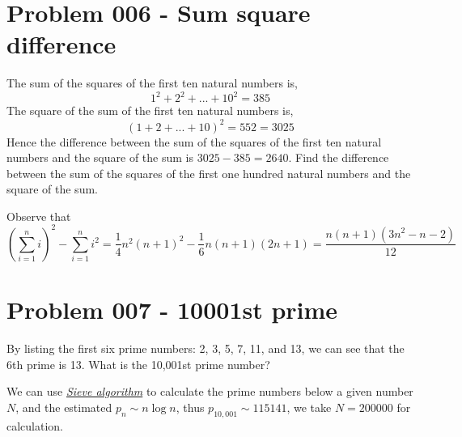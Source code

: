 \section{Problem 006 - Sum square difference}
\begin{prob}
The sum of the squares of the first ten natural numbers is,
$$1^2 + 2^2 + ... + 10^2 = 385$$
The square of the sum of the first ten natural numbers is,
$$(1 + 2 + ... + 10)^2 = 552 = 3025$$
Hence the difference between the sum of the squares of the first ten natural numbers and the square of the sum is $3025 - 385 = 2640$.
Find the difference between the sum of the squares of the first one hundred natural numbers and the square of the sum.
\end{prob}

\begin{sol}
Observe that
$$(\sum_{i = 1}^n i )^2 - \sum_{i = 1}^n i^2 = \frac{1}{4} n^2(n + 1)^2  - \frac{1}{6} n (n + 1)(2 n + 1)  = \frac{n(n + 1) (3 n ^2 - n - 2)}{12}$$
\end{sol}


\section{Problem 007 - 10001st prime}
\begin{prob}
By listing the first six prime numbers: 2, 3, 5, 7, 11, and 13, we can see that the 6th prime is 13.
What is the 10,001st prime number?
\end{prob}
\begin{sol}
We can use \href{http://en.wikipedia.org/wiki/Sieve_of_Eratosthenes}{\emph{Sieve algorithm}} to calculate the prime numbers below a given number $N$, and the estimated $p_n \sim n \log n$, thus $p_{10,001} \sim 115141$, we take $N = 200000$ for calculation. 
\end{sol}

